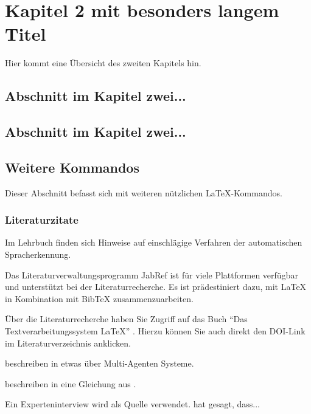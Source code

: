 \chapter{Kapitel 2 mit besonders langem Titel}
\label{sec:Kapitel2}

Hier kommt eine Übersicht des zweiten Kapitels hin.

\section{Abschnitt im Kapitel zwei...}
\label{sec:abschnitt2.1}

\section{Abschnitt im Kapitel zwei...}
%
%

\section{Weitere Kommandos}
Dieser Abschnitt befasst sich mit weiteren nützlichen \LaTeX-Kommandos.

\subsection{Literaturzitate}
\label{sec:literaturzitate}

Im Lehrbuch \autocite{Schukat-Talamazzini1995}
finden sich Hinweise auf einschlägige Verfahren der automatischen Spracherkennung.

Das Literaturverwaltungsprogramm JabRef \autocite{Kopp2018} ist für viele Plattformen verfügbar und unterstützt bei der Literaturrecherche. Es ist prädestiniert dazu, mit {\LaTeX} in Kombination mit {Bib\TeX} zusammenzuarbeiten.

Über die Literaturrecherche haben Sie Zugriff auf das Buch "`Das Textverarbeitungssystem LaTeX"' \autocite[15]{Oechsner2015}. Hierzu können Sie auch direkt den DOI-Link im Literaturverzeichnis anklicken.

\citeauthor{TyrinMultiAgent2012} beschreiben in \autocite{TyrinMultiAgent2012} etwas über Multi-Agenten Systeme. 

\citeauthor{Ghazali2012} beschreiben in \autocite{Ghazali2012} eine Gleichung aus \autocite{moore2007basic}.

Ein Experteninterview wird als Quelle verwendet. \citeauthor{Interviewpartnerin2021} hat gesagt, dass... \autocite[Aussage-Nr]{Interviewpartnerin2021}

